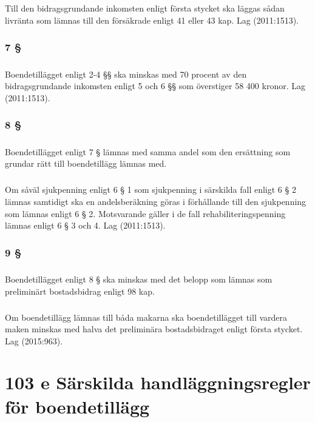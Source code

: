 \documentclass[a4paper,notitlepage,openany,10pt]{book}
\begin{document}
\paragraph*{}
Till den bidragsgrundande inkomsten enligt första stycket ska läggas sådan livränta som lämnas till den försäkrade enligt 41 eller 43 kap.
Lag (2011:1513).
\subsection*{7 §}
\paragraph*{}
Boendetillägget enligt 2-4 §§ ska minskas med 70 procent av den bidragsgrundande inkomsten enligt 5 och 6 §§ som överstiger 58 400 kronor.
Lag (2011:1513).
\subsection*{8 §}
\paragraph*{}
Boendetillägget enligt 7 § lämnas med samma andel som den ersättning som grundar rätt till boendetillägg lämnas med.
\paragraph*{}
Om såväl sjukpenning enligt 6 § 1 som sjukpenning i särskilda fall enligt 6 § 2 lämnas samtidigt ska en andelsberäkning göras i förhållande till den sjukpenning som lämnas enligt 6 § 2. Motsvarande gäller i de fall rehabiliteringspenning lämnas enligt 6 § 3 och 4.
Lag (2011:1513).
\subsection*{9 §}
\paragraph*{}
Boendetillägget enligt 8 § ska minskas med det belopp som lämnas som preliminärt bostadsbidrag enligt 98 kap.
\paragraph*{}
Om boendetillägg lämnas till båda makarna ska boendetillägget till vardera maken minskas med halva det preliminära bostadsbidraget enligt första stycket.
Lag (2015:963).
\chapter*{103 e Särskilda handläggningsregler för boendetillägg}
\end{document}

